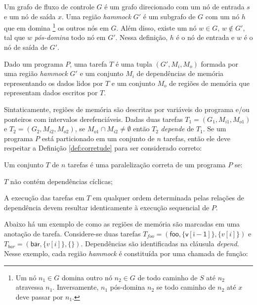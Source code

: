 \documentclass[sigplan,10pt,review]{acmart}
\begin{document}
\begin{definition} 
\label{def:hammock}
Um grafo de fluxo de controle $G$ é um grafo direcionado com um nó de entrada
$s$ e um nó de saída $x$. Uma região \textit{hammock} $G'$ é um subgrafo de $G$ com um nó $h$ que {em domina}
\footnote{Um nó $n_1 \in G$ domina outro nó
$n_2 \in G$ de todo caminho de  $S$ até $n_2$ atravessa $n_1$.
Inversamente, $n_1$ pós-domina $n_2$ se todo caminho de $n_2$ até $x$ deve passar por $n_1$.} os outros nós em $G$.
Além disso, existe um nó $w \in G$, $w \notin G'$, tal que $w$ {\em pós-domina} todo nó em $G'$. Nessa definição,
$h$ é o nó de entrada e $w$ é o nó de saída de $G'$.  
\end{definition}

\begin{definition} [Tarefa]
\label{def:task}
Dado um programa $P$, uma tarefa $T$ é uma tupla $(G', M_i, M_o)$ formada
por uma região \textit{hammock} $G'$ e um conjunto $M_i$ de dependências de memória representando
os dados lidos por $T$ e um conjunto $M_o$ de regiões de memória que representam dados escritos por $T$.
\end{definition}

Sintaticamente, regiões de memória são descritas por variáveis do programa e/ou ponteiros com intervalos derefenciáveis.
Dadas duas tarefas $T_1 = (G_1, M_{i1}, M_{o1})$ e $T_2 = (G_2, M_{i2}, M_{o2})$, 
se $M_{o1} \cap M_{i2} \neq \emptyset$ então $T_2$ {\em depende} de $T_1$. Se um programa $P$ está particionado em um 
conjunto de $n$ tarefas, então ele deve respeitar a Definição \ref{def:corretude} para ser considerado correto:

\begin{definition} [Corretude]
\label{def:corretude}
Um conjunto $T$ de $n$ tarefas é uma paralelização correta de um programa $P$ se:
\begin{compactenum}
\item $T$ não contém dependências cíclicas;
\item A execução das tarefas em $T$ em qualquer ordem determinada pelas relações de dependência devem resultar
identicamente à execução sequencial de $P$.
\end{compactenum}
\end{definition}

Abaixo há um exemplo de como as regiões de memória são marcadas em uma anotação de tarefa.
Considere-se duas tarefas $T_{\mathit{foo}} = (\mathsf{foo}, \{\mathsf{v[i - 1]}\},
\{v[i]\})$ e $T_{\mathit{bar}} = (\mathsf{bar}, \{v[i]\}, \{\})$. Dependências são identificadas na cláusula \textit{depend}. 
Nesse exemplo, cada região \textit{hammock} é constituída por uma chamada de função:
\end{document}
